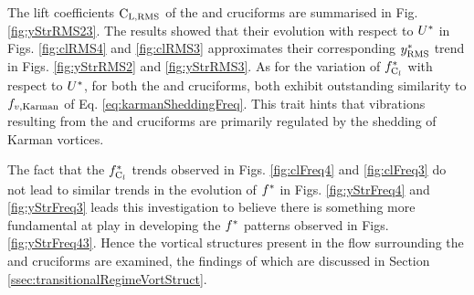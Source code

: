 \documentclass[oneside]{utmthesis}
\begin{document}
The \rms{} lift coefficients $\text{C}_{\text{L,RMS}}$ of the \angfo{} and \angth{} cruciforms are summarised in Fig. \ref{fig:yStrRMS23}. The results showed that their evolution with respect to $U^{*}$ in Figs. \ref{fig:clRMS4} and \ref{fig:clRMS3} approximates their corresponding $y^{*}_{\text{RMS}}$ trend in Figs. \ref{fig:yStrRMS2} and \ref{fig:yStrRMS3}. As for the variation of $f_{\text{C}_{l}}^{*}$ with respect to $U^{*}$, for both the \angfo{} and \angth{} cruciforms, both exhibit outstanding similarity to $f_{v,\text{Karman}}$ of Eq. \ref{eq:karmanSheddingFreq}. This trait hints that vibrations resulting from the \angfo{} and \angth{} cruciforms are primarily regulated by the shedding of Karman vortices.

The fact that the $f_{\text{C}_{l}}^{*}$ trends observed in Figs. \ref{fig:clFreq4} and \ref{fig:clFreq3} do not lead to similar trends in the evolution of $f^{*}$ in Figs. \ref{fig:yStrFreq4} and \ref{fig:yStrFreq3} leads this investigation to believe there is something more fundamental at play in developing the $f^{*}$ patterns observed in Figs. \ref{fig:yStrFreq43}. Hence the vortical structures present in the flow surrounding the \angfo{} and \angth{} cruciforms are examined, the findings of which are discussed in Section \ref{ssec:transitionalRegimeVortStruct}.
\end{document}
